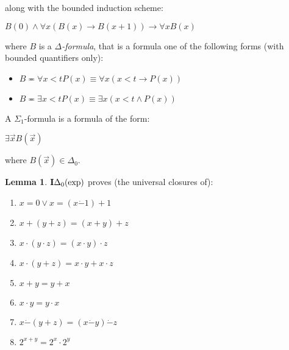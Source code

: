 \documentclass[8pt]{article}
\theoremstyle{definition}
\theoremstyle{definition}
\theoremstyle{definition}
\theoremstyle{definition}
\theoremstyle{definition}
\theoremstyle{definition}
\theoremstyle{definition}
\theoremstyle{definition}
\newtheorem{lemma}{Lemma}[section]
\theoremstyle{definition}
\theoremstyle{definition}
\theoremstyle{definition}
\theoremstyle{definition}
\theoremstyle{definition}
\theoremstyle{question}
\begin{document}
\vspace{\baselineskip}

along with the bounded induction scheme:
\begin{center}
  $B(0) \land \forall x (B (x) \to B(x + 1)) \to \forall x B(x)$
\end{center}
where $B$ is a \emph{$\Delta$-formula}, that is a formula one of the following forms (with bounded quantifiers only):
\begin{itemize}
  \item $B \eqcirc \forall x < t P(x) \equiv \forall x (x < t \to P(x))$ 
  \item $B \eqcirc \exists x < t P(x) \equiv \exists x (x < t \land P(x))$
\end{itemize}

A $\Sigma_1$-formula is a formula of the form:
\begin{center}
  $\exists \vec{x} B(\vec{x})$
\end{center}
where $B(\vec{x}) \in \Delta_0$.

\begin{lemma}
  ${\bf I}\Delta_0(\operatorname{exp})$ proves (the universal closures of):
  \begin{enumerate}
    \item $x = 0 \lor x = (x \dot{-} 1) + 1$
    \item $x + (y + z) = (x + y) + z$
    \item $x \cdot (y \cdot z) = (x \cdot y) \cdot z$
    \item $x \cdot (y + z) = x \cdot y + x \cdot z$
    \item $x + y = y + x$
    \item $x \cdot y = y \cdot x$
    \item $x \dot{-} (y + z) = (x \dot{-} y) \dot{-} z$
    \item $2^{x + y} = 2^x \cdot 2^y$
  \end{enumerate}
\end{lemma}
\end{document}
